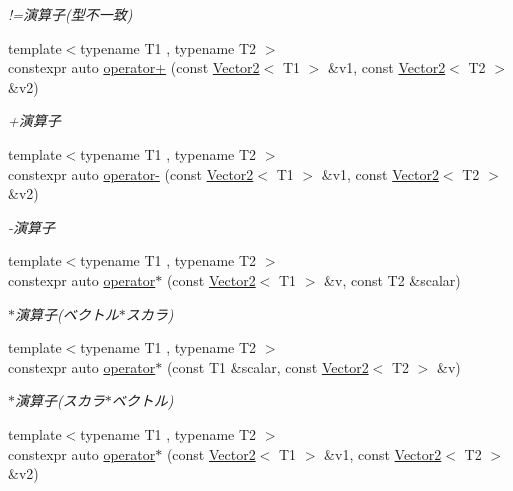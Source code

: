 \begin{DoxyCompactItemize}
\begin{DoxyCompactList}\small\item\em !=演算子(型不一致) \end{DoxyCompactList}\item 
{\footnotesize template$<$typename T1 , typename T2 $>$ }\\constexpr auto \mbox{\hyperlink{namespacesaki_afa72a33da6ac050bfd8e91b9eae1422a}{operator+}} (const \mbox{\hyperlink{classsaki_1_1_vector2}{Vector2}}$<$ T1 $>$ \&v1, const \mbox{\hyperlink{classsaki_1_1_vector2}{Vector2}}$<$ T2 $>$ \&v2)
\begin{DoxyCompactList}\small\item\em +演算子 \end{DoxyCompactList}\item 
{\footnotesize template$<$typename T1 , typename T2 $>$ }\\constexpr auto \mbox{\hyperlink{namespacesaki_a4b1f99c0832914f9a23e0672cf9fd0fa}{operator-\/}} (const \mbox{\hyperlink{classsaki_1_1_vector2}{Vector2}}$<$ T1 $>$ \&v1, const \mbox{\hyperlink{classsaki_1_1_vector2}{Vector2}}$<$ T2 $>$ \&v2)
\begin{DoxyCompactList}\small\item\em -\/演算子 \end{DoxyCompactList}\item 
{\footnotesize template$<$typename T1 , typename T2 $>$ }\\constexpr auto \mbox{\hyperlink{namespacesaki_a9b267db283c1b65ccf046a239443f5dd}{operator$\ast$}} (const \mbox{\hyperlink{classsaki_1_1_vector2}{Vector2}}$<$ T1 $>$ \&v, const T2 \&scalar)
\begin{DoxyCompactList}\small\item\em $\ast$演算子(ベクトル$\ast$スカラ) \end{DoxyCompactList}\item 
{\footnotesize template$<$typename T1 , typename T2 $>$ }\\constexpr auto \mbox{\hyperlink{namespacesaki_aec277082fba09344ebcffc5bdab6eb49}{operator$\ast$}} (const T1 \&scalar, const \mbox{\hyperlink{classsaki_1_1_vector2}{Vector2}}$<$ T2 $>$ \&v)
\begin{DoxyCompactList}\small\item\em $\ast$演算子(スカラ$\ast$ベクトル) \end{DoxyCompactList}\item 
{\footnotesize template$<$typename T1 , typename T2 $>$ }\\constexpr auto \mbox{\hyperlink{namespacesaki_aa99ace9b4d1710c38d180a75514e748f}{operator$\ast$}} (const \mbox{\hyperlink{classsaki_1_1_vector2}{Vector2}}$<$ T1 $>$ \&v1, const \mbox{\hyperlink{classsaki_1_1_vector2}{Vector2}}$<$ T2 $>$ \&v2)

\end{DoxyCompactItemize}
